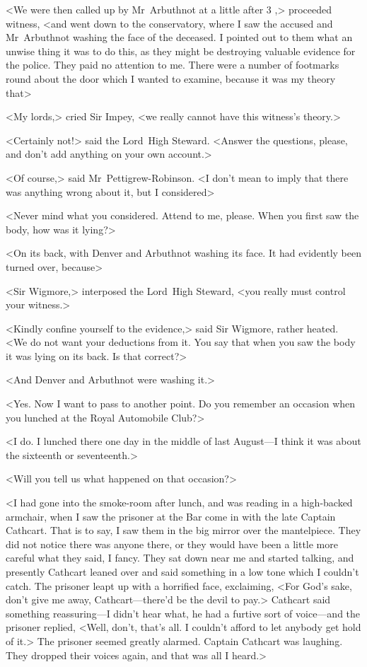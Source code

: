 <We were then called up by Mr~Arbuthnot at a little after 3 ,> proceeded witness, <and went down to the conservatory, where I saw the accused and Mr~Arbuthnot washing the face of the deceased. I pointed out to them what an unwise thing it was to do this, as they might be destroying valuable evidence for the police. They paid no attention to me. There were a number of footmarks round about the door which I wanted to examine, because it was my theory that\longdash>

<My lords,> cried Sir Impey, <we really cannot have this witness's theory.>

<Certainly not!> said the Lord~High Steward. <Answer the questions, please, and don't add anything on your own account.>

<Of course,> said Mr~Pettigrew-Robinson. <I don't mean to imply that there was anything wrong about it, but I considered\longdash>

<Never mind what you considered. Attend to me, please. When you first saw the body, how was it lying?>

<On its back, with Denver and Arbuthnot washing its face. It had evidently been turned over, because\longdash>

<Sir Wigmore,> interposed the Lord~High Steward, <you really must control your witness.>

<Kindly confine yourself to the evidence,> said Sir Wigmore, rather heated. <We do not want your deductions from it. You say that when you saw the body it was lying on its back. Is that correct?>

<And Denver and Arbuthnot were washing it.>

<Yes. Now I want to pass to another point. Do you remember an occasion when you lunched at the Royal Automobile Club?>

<I do. I lunched there one day in the middle of last August—I think it was about the sixteenth or seventeenth.>

<Will you tell us what happened on that occasion?>

<I had gone into the smoke-room after lunch, and was reading in a high-backed armchair, when I saw the prisoner at the Bar come in with the late Captain Cathcart. That is to say, I saw them in the big mirror over the mantelpiece. They did not notice there was anyone there, or they would have been a little more careful what they said, I fancy.  They sat down near me and started talking, and presently Cathcart leaned over and said something in a low tone which I couldn't catch.  The prisoner leapt up with a horrified face, exclaiming, <For God's sake, don't give me away, Cathcart—there'd be the devil to pay.> Cathcart said something reassuring—I didn't hear what, he had a furtive sort of voice—and the prisoner replied, <Well, don't, that's all. I couldn't afford to let anybody get hold of it.> The prisoner seemed greatly alarmed. Captain Cathcart was laughing. They dropped their voices again, and that was all I heard.>

